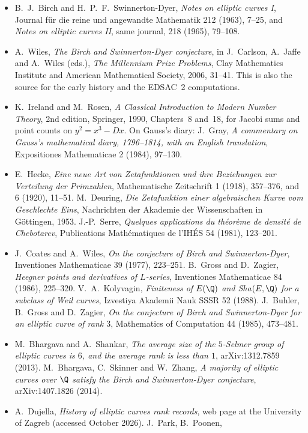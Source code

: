 \begin{itemize}
\item B.~J.~Birch and H.~P.~F.~Swinnerton-Dyer, \emph{Notes on elliptic curves I}, Journal f\"ur die reine und angewandte Mathematik 212 (1963), 7--25,
and \emph{Notes on elliptic curves II}, same journal, 218 (1965), 79--108.
\item A.~Wiles, \emph{The Birch and Swinnerton-Dyer conjecture}, in J.~Carlson, A.~Jaffe and A.~Wiles (eds.), \emph{The Millennium Prize Problems}, Clay
Mathematics Institute and American Mathematical Society, 2006, 31--41. This is also the source for the early history and the EDSAC~2 computations.
\item K.~Ireland and M.~Rosen, \emph{A Classical Introduction to Modern Number Theory}, 2nd edition, Springer, 1990, Chapters~8 and~18, for Jacobi sums and
point counts on $y^2=x^3-Dx$. On Gauss's diary: J.~Gray, \emph{A commentary on Gauss's mathematical diary, 1796--1814, with an English translation},
Expositiones Mathematicae 2 (1984), 97--130.
\item E.~Hecke, \emph{Eine neue Art von Zetafunktionen und ihre Beziehungen zur Verteilung der Primzahlen}, Mathematische Zeitschrift 1 (1918), 357--376,
and 6 (1920), 11--51. M.~Deuring, \emph{Die Zetafunktion einer algebraischen Kurve vom Geschlechte Eins}, Nachrichten der Akademie der Wissenschaften in
G\"ottingen, 1953. J.-P.~Serre, \emph{Quelques applications du th\'eor\`eme de densit\'e de Chebotarev}, Publications Math\'ematiques de l'IH\'ES 54 (1981),
123--201.
\item J.~Coates and A.~Wiles, \emph{On the conjecture of Birch and Swinnerton-Dyer}, Inventiones Mathematicae 39 (1977), 223--251. B.~Gross and D.~Zagier,
\emph{Heegner points and derivatives of $L$-series}, Inventiones Mathematicae 84 (1986), 225--320. V.~A.~Kolyvagin, \emph{Finiteness of $E(\Q)$ and Sha$(E,\Q)$
for a subclass of Weil curves}, Izvestiya Akademii Nauk SSSR 52 (1988). J.~Buhler, B.~Gross and D.~Zagier, \emph{On the conjecture of Birch and
Swinnerton-Dyer for an elliptic curve of rank $3$}, Mathematics of Computation 44 (1985), 473--481.
\item M.~Bhargava and A.~Shankar, \emph{The average size of the $5$-Selmer group of elliptic curves is $6$, and the average rank is less than $1$},
arXiv:1312.7859 (2013). M.~Bhargava, C.~Skinner and W.~Zhang, \emph{A majority of elliptic curves over $\Q$ satisfy the Birch and Swinnerton-Dyer conjecture},
arXiv:1407.1826 (2014).
\item A.~Dujella, \emph{History of elliptic curves rank records}, web page at the University of Zagreb (accessed October 2026). J.~Park, B.~Poonen,

\end{itemize}

